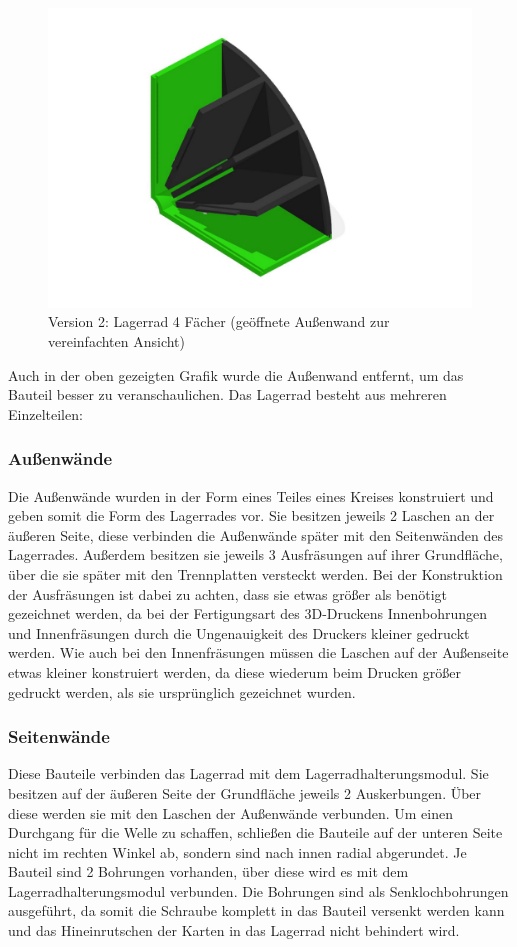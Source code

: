 \begin{figure}[H]
    \centering
    \includegraphics[scale=0.5,page=1]{fig/mech/LagerRad4F}
    \caption{Version 2: Lagerrad 4 Fächer (geöffnete Außenwand zur vereinfachten Ansicht)}
\end{figure}


Auch in der oben gezeigten Grafik wurde die Außenwand entfernt, um das Bauteil besser zu veranschaulichen.
Das Lagerrad besteht aus mehreren Einzelteilen:

\subsubsection{Außenwände}
Die Außenwände wurden in der Form eines Teiles eines Kreises konstruiert und geben somit die Form des Lagerrades vor. Sie besitzen jeweils 2 Laschen an der äußeren Seite, diese verbinden die Außenwände später mit den Seitenwänden des Lagerrades.
Außerdem besitzen sie jeweils 3 Ausfräsungen auf ihrer Grundfläche, über die sie später mit den Trennplatten versteckt werden. Bei der Konstruktion der Ausfräsungen ist dabei zu achten, dass sie etwas größer als benötigt gezeichnet werden, da bei der
Fertigungsart des 3D-Druckens Innenbohrungen und Innenfräsungen durch die Ungenauigkeit des Druckers kleiner gedruckt werden. Wie auch bei den Innenfräsungen müssen die Laschen auf der Außenseite etwas kleiner konstruiert werden, da diese wiederum beim
Drucken größer gedruckt werden, als sie ursprünglich gezeichnet wurden.

\subsubsection{Seitenwände}
Diese Bauteile verbinden das Lagerrad mit dem Lagerradhalterungsmodul. Sie besitzen auf der äußeren Seite der Grundfläche
jeweils 2 Auskerbungen. Über diese werden sie mit den Laschen der Außenwände verbunden. Um einen Durchgang für die Welle zu schaffen,
schließen die Bauteile auf der unteren Seite nicht im rechten Winkel ab, sondern sind nach innen radial abgerundet.
Je Bauteil sind 2 Bohrungen vorhanden, über diese wird es mit dem Lagerradhalterungsmodul verbunden.
Die Bohrungen sind als Senklochbohrungen ausgeführt, da somit die Schraube komplett in das Bauteil versenkt werden kann
 und das Hineinrutschen der Karten in das Lagerrad nicht behindert wird.

